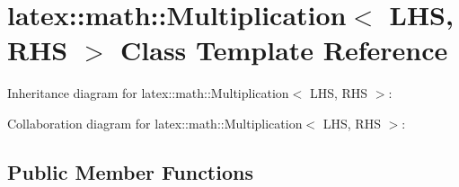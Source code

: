 \hypertarget{classlatex_1_1math_1_1Multiplication}{\section{latex\-:\-:math\-:\-:\-Multiplication$<$ \-L\-H\-S, \-R\-H\-S $>$ \-Class \-Template \-Reference}
\label{classlatex_1_1math_1_1Multiplication}
}


\-Inheritance diagram for latex\-:\-:math\-:\-:\-Multiplication$<$ \-L\-H\-S, \-R\-H\-S $>$\-:


\-Collaboration diagram for latex\-:\-:math\-:\-:\-Multiplication$<$ \-L\-H\-S, \-R\-H\-S $>$\-:
\subsection*{\-Public \-Member \-Functions}
